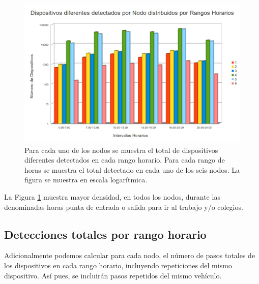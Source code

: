 \documentclass[twocolumn,twoside]{Jornadas}
\begin{document}
 \begin{figure}[htb]
 \begin{center}
 \includegraphics[scale=0.20]{VehiculosDiferentesPorHoras.jpg}
 \caption{Para cada uno de los nodos se muestra el total de dispositivos diferentes detectados en cada rango horario. Para cada rango de horas se muestra el total detectado en cada uno de los seis nodos. La figura se muestra en escala logarítmica.
 \label{VehiculosDiferentesPorHoras}}
 \end{center}
 \end{figure}
 
La Figura \ref{VehiculosDiferentesPorHoras} muestra mayor densidad, en todos los nodos, durante las denominadas horas punta de entrada o salida para ir al trabajo y/o colegios.

\subsection{Detecciones totales por rango horario}


Adicionalmente podemos calcular para cada nodo, el número de pasos totales de los dispositivos en cada rango horario, incluyendo repeticiones del mismo dispositivo. 
Así pues, se incluirán pasos repetidos del mismo vehículo.
\end{document}
